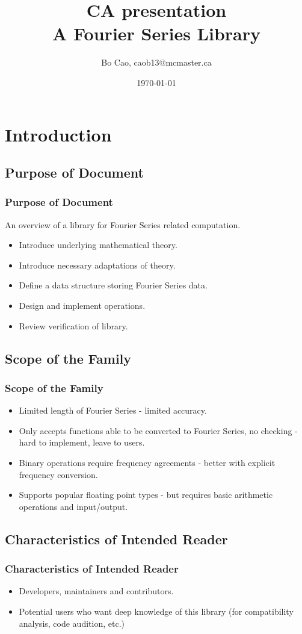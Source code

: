 \documentclass{beamer}
\title{CA presentation\\A Fourier Series Library}
\author{Bo Cao, caob13@mcmaster.ca}
\date{\today}
\begin{document}
	\titlepage
	\section{Introduction}
	\subsection{Purpose of Document}
	\begin{frame}
		\frametitle{Purpose of Document}
		An overview of a library for Fourier Series related computation.
		\begin{itemize}
			\item Introduce underlying mathematical theory.
			\item Introduce necessary adaptations of theory.
			\item Define a data structure storing Fourier Series data.
			\item Design and implement operations.
			\item Review verification of library.
		\end{itemize}
	\end{frame}

	\subsection{Scope of the Family}
	\begin{frame}
		\frametitle{Scope of the Family}
		\begin{itemize}
			\item Limited length of Fourier Series - limited accuracy.
			\item Only accepts functions able to be converted to Fourier Series, no checking - hard to implement, leave to users.
			\item Binary operations require frequency agreements - better with explicit frequency conversion.
			\item Supports popular floating point types - but requires basic arithmetic operations and input/output.  
		\end{itemize}
	\end{frame}

	\subsection{Characteristics of Intended Reader}
	\begin{frame}
		\frametitle{Characteristics of Intended Reader}
		\begin{itemize}
			\item Developers, maintainers and contributors.
			\item Potential users who want deep knowledge of this library (for compatibility analysis, code audition, etc.)
		\end{itemize}
	\end{frame}
\end{document}
